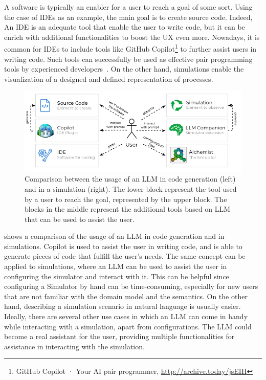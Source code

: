 \documentclass[conference]{IEEEtran}
\begin{document}
A software is typically an enabler for a user to reach a goal of some sort.
%
Using the case of \acp{IDE} as an example,
the main goal is to create source code.
%
Indeed,
An IDE is an adequate tool that enable the user to write code,
but it can be enrich with additional functionalities to boost the \ac{UX} even more.
%
Nowadays,
it is common for \acp{IDE} to include tools like GitHub Copilot\footnote{
    GitHub Copilot · Your AI pair programmer, \url{http://archive.today/jsEIH}
} to further assist users in writing code.
%
Such tools can successfully be used as effective pair programming tools by experienced developers~\cite{DBLP:journals/jss/DakhelMNKDJ23}.
%
On the other hand,
simulations enable the visualization of a designed and defined representation of processes.
%
\begin{figure}
    \includegraphics[width=\columnwidth]{use-case}
    \caption{
        Comparison between the usage of an LLM in code generation (left) and in a simulation (right).
        The lower block represent the tool used by a user to reach the goal, represented by the upper block.
        The blocks in the middle represent the additional tools based on LLM that can be used to assist the user.
    }
    \label{fig:usecase}
\end{figure}
%
 shows a comparison of the usage of an \ac{LLM} in code generation and in simulations.
%
Copilot is used to assist the user in writing code,
and is able to generate pieces of code that fulfill the user's needs.
%
The same concept can be applied to simulations,
where an \ac{LLM} can be used to assist the user in configuring the simulator and interact with it.
%
This can be helpful since configuring a Simulator by hand can be time-consuming,
especially for new users that are not familiar with the domain model and the semantics.
%
On the other hand,
describing a simulation scenario in natural language is usually easier.
%
Ideally,
there are several other use cases in which an \ac{LLM} can come in handy while interacting with a simulation,
apart from configurations.
%
The \ac{LLM} could become a real assistant for the user,
providing multiple functionalities for assistance in interacting with the simulation.
%
\end{document}
